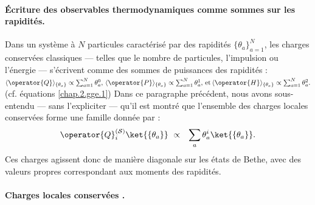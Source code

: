 \paragraph{Écriture des observables thermodynamiques comme sommes sur les rapidités.}

Dans un système à $N$ particules caractérisé par des rapidités $\{ \theta_a \}_{a = 1}^N$, les charges conservées classiques — telles que le nombre de particules, l’impulsion ou l’énergie — s’écrivent comme des sommes de puissances des rapidités :
\(
	\langle \operator{Q} \rangle_{\{ \theta_a\} } \propto \sum_{a = 1}^N \theta_a^0 , \,  \langle \operator{P} \rangle_{\{ \theta_a\} } \propto \sum_{a = 1}^N \theta_a^1  ,\,  \mbox{et} \, \langle \operator{H} \rangle_{\{ \theta_a\} } \propto \sum_{a = 1}^N \theta_a^2 .	
\)
(cf. équations \eqref{chap.2.gge.1})
Dans ce paragraphe précédent, nous avons sous-entendu — sans l’expliciter — qu’il est montré que l’ensemble des charges locales conservées forme une famille donnée par :
\begin{eqnarray}
	\operator{Q}_i^{(\mathcal{S})} \ket{\{\theta_a\} } & \propto & \sum_a \theta_a^i \ket{\{\theta_a\} }.
\end{eqnarray}
Ces charges agissent donc de manière diagonale sur les états de Bethe, avec des valeurs propres correspondant aux moments des rapidités.
\paragraph{Charges locales conservées .\label{sec:charges-gen}}


